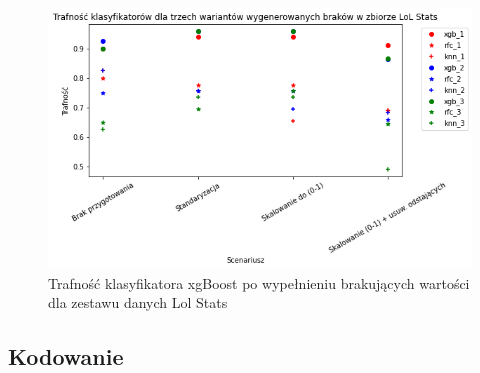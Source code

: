 \documentclass{book}
\begin{document}
    \begin{figure}[H]
        \centerline{\includegraphics[scale=0.8]{Lol_stats_Standaryzacja}}
        \centering
        \caption{Trafność klasyfikatora xgBoost po wypełnieniu brakujących wartości dla zestawu danych Lol Stats}
        \end{figure}


\subsection{Kodowanie}
\end{document}
